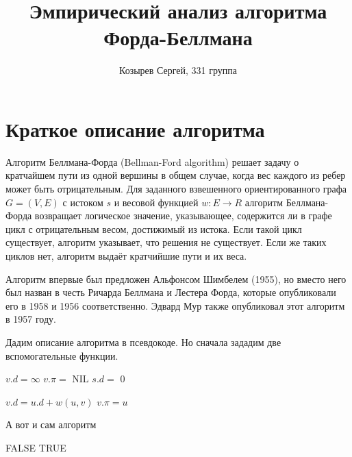 \documentclass[a4paper,12pt]{article}
\begin{document}
\title{Эмпирический анализ алгоритма Форда-Беллмана}
\author{Козырев Сергей, 331 группа}
\maketitle
\newpage
\tableofcontents

\newpage
\section{Краткое описание алгоритма}
Алгоритм Беллмана-Форда (Bellman-Ford algorithm) решает задачу о кратчайшем 
пути из одной вершины в общем случае, когда вес каждого из ребер может быть 
отрицательным. Для заданного взвешенного ориентированного графа $G = (V, E)$ с 
истоком $s$ и весовой функцией $w : E \rightarrow R$ алгоритм Беллмана-Форда 
возвращает логическое значение, указывающее, содержится ли в графе цикл с 
отрицательным весом, достижимый из истока. Если такой цикл существует, алгоритм 
указывает, что решения не существует. Если же таких циклов нет, алгоритм выдаёт 
кратчийшие пути и их веса. \cite{cormen}

Алгоритм впервые был предложен Альфонсом Шимбелем (1955), но вместо него был 
назван в честь Ричарда Беллмана и Лестера Форда, которые опубликовали его в 
1958 и 1956 соответственно. Эдвард Мур также опубликовал этот алгоритм в 
1957 году. \cite{schrijver}

Дадим описание алгоритма в псевдокоде. Но сначала зададим две вспомогательные 
функции.
\begin{algorithmic}
      \State $v.d = \infty$
      \State $v.\pi =$ NIL
    \EndFor
    \State $s.d =$ 0
  \EndFunction

      \State $v.d = u.d + w(u, v)$
      \State $v.\pi = u$
    \EndIf
  \EndFunction
\end{algorithmic}
А вот и сам алгоритм
\begin{algorithmic}
  \State {}
        \State {}
      \EndFor
    \EndFor
        \State \Return FALSE
      \EndIf
    \EndFor
    \State \Return TRUE
  \EndFunction
\end{algorithmic}
\end{document}

